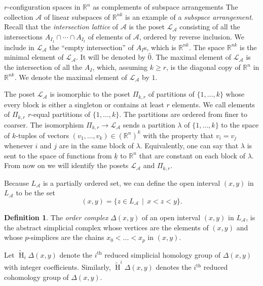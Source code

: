 \documentclass[12pt]{amsart}
\newcommand{\R}{{\mathbb R}}
\newcommand{\Ho}{\operatorname{H}}
\newcommand{\calA}{{\mathcal{A}}}
\theoremstyle{plain}
\theoremstyle{definition}
\newtheorem{defin}[thm]{Definition}
\theoremstyle{remark}
\begin{document}
\begin{section}{$r$-configuration spaces in $\mathbb R^n$ as complements of subspace arrangements}
The collection $\mathcal{A}$ of linear subspaces of $\R^{nk}$ is an example of a {\it subspace arrangement}. Recall that the {\it intersection lattice} of $\mathcal{A}$ is the poset $\mathcal{L}_{\mathcal A}$ consisting of all the intersections $A_{I_1}\cap\cdots\cap A_{I_t}$ of elements of $\mathcal{A}$, ordered by reverse inclusion. We include in $\mathcal{L}_{\mathcal A}$ the ``empty intersection'' of $A_I$s, which is $\R^{nk}$. The space $\R^{nk}$ is the minimal element of $\mathcal{L}_{\mathcal A}$. It will be denoted by $\hat 0$. The maximal element of $\mathcal{L}_{\mathcal A}$ is the intersection of all the $A_I$, which, assuming $k\ge r$, is the diagonal copy of $\R^n$ in $\R^{nk}$. We denote the maximal element of $\mathcal{L}_{\mathcal A}$ by $\hat 1$.

The poset $\mathcal{L}_{\mathcal A}$ is isomorphic to the poset $\Pi_{k, r}$ of partitions of $\{1, \ldots, k\}$ whose every block is either a singleton or contains at least $r$ elements. We call elements of $\Pi_{k,r}$ $r$-equal partitions of $\{1, \ldots, k\}$. The partitions are ordered from finer to coarser. The isomorphism $\Pi_{k, r}\to \mathcal{L}_{\mathcal A}$ sends a partition $\lambda$ of $\{1, \ldots, k\}$ to the space of $k$-tuples of vectors $(v_1, \ldots, v_k)\in (\R^n)^k$ with the property that $v_i=v_j$ whenever $i$ and $j$ are in the same block of $\lambda$. Equivalently, one can say that $\lambda$ is sent to the space of functions from $\underline{k}$ to $\R^n$ that are constant on each block of $\lambda$. From now on we will identify the posets $\mathcal{L}_{\mathcal A}$ and $\Pi_{k, r}$.


Because $L_{\calA}$ is a partially ordered set, we can define the open interval $(x,y)$ in $L_{\calA}$ to be the set
$$(x,y)=\{z \in L_{\calA} \ \ | \ \ x<z<y\}.$$
\begin{defin}
The \textit{order complex} $\Delta(x,y)$ of an open interval $(x,y)$ in $L_{\calA}$, is the abstract simplicial complex whose vertices are the elements of $(x,y)$ and whose $p$-simplices are the chains $x_0<...<x_p$ in $(x,y)$.
\end{defin}
Let $\widetilde{\Ho}_{i} \Delta(x,y)$ denote the $i^{\text{th}}$ reduced simplicial homology group of $\Delta(x,y)$ with integer coefficients. Similarly, $\widetilde{\Ho}^{i}\Delta(x,y)$ denotes the $i^{\text{th}}$ reduced cohomology group of $\Delta(x,y)$.


\end{section}
\end{document}
